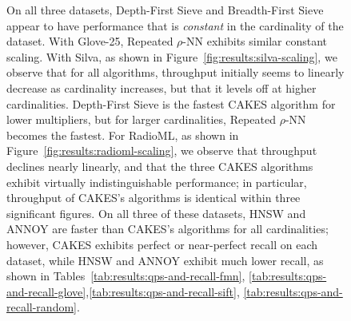\begin{figure}
{    On all three datasets, Depth-First Sieve and Breadth-First Sieve appear to have performance that is \textit{constant} in the cardinality of the dataset.
    With Glove-25, Repeated $\rho$-NN exhibits similar constant scaling.
    With Silva, as shown in Figure~\ref{fig:results:silva-scaling}, we observe that for all algorithms, throughput initially seems to linearly decrease as cardinality increases, but that it levels off at higher cardinalities.
    Depth-First Sieve is the fastest CAKES algorithm for lower multipliers, but for larger cardinalities, Repeated $\rho$-NN becomes the fastest.
    For RadioML, as shown in Figure~\ref{fig:results:radioml-scaling}, we observe that throughput declines nearly linearly, and that the three CAKES algorithms exhibit virtually indistinguishable performance; in particular, throughput of CAKES's algorithms is identical within three significant figures.
    On all three of these datasets, HNSW and ANNOY are faster than CAKES's algorithms for all cardinalities; however, CAKES exhibits perfect or near-perfect recall on each dataset, while HNSW and ANNOY exhibit much lower recall, as shown in Tables~\ref{tab:results:qps-and-recall-fmn}, \ref{tab:results:qps-and-recall-glove},\ref{tab:results:qps-and-recall-sift}, \ref{tab:results:qps-and-recall-random}.
    }
    \label{fig:results:scaling-plots}
\end{figure}






